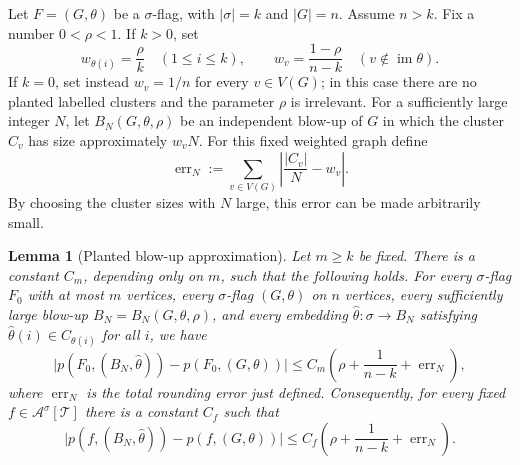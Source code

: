 \documentclass[11pt]{article}
\newtheorem{lemma}[theorem]{Lemma}
\theoremstyle{definition}
\newcommand{\A}{\mathcal{A}}
\newcommand{\T}{\mathcal{T}}
\begin{document}
Let $F=(G,\theta)$ be a $\sigma$-flag, with $|\sigma|=k$ and $|G|=n$.  Assume
$n>k$.  Fix a number $0<\rho<1$.  If $k>0$, set
\[
  w_{\theta(i)}=\frac{\rho}{k}\quad(1\le i\le k),
  \qquad
  w_v=\frac{1-\rho}{n-k}\quad(v\notin \operatorname{im}\theta).
\]
If $k=0$, set instead $w_v=1/n$ for every $v\in V(G)$; in this case there are
no planted labelled clusters and the parameter $\rho$ is irrelevant.
For a sufficiently large integer $N$, let $B_N(G,\theta,\rho)$ be an independent
blow-up of $G$ in which the cluster $C_v$ has size approximately $w_vN$.
For this fixed weighted graph define
\[
  \operatorname{err}_N
  :=
  \sum_{v\in V(G)}\left|\frac{|C_v|}{N}-w_v\right|.
\]
By choosing the cluster sizes with $N$ large, this error can be made arbitrarily
small.

\begin{lemma}[Planted blow-up approximation]\label{lem:planted}
Let $m\ge k$ be fixed.  There is a constant $C_m$, depending only on $m$, such
that the following holds.  For every $\sigma$-flag $F_0$ with at most $m$
vertices, every $\sigma$-flag $(G,\theta)$ on $n$ vertices, every sufficiently
large blow-up $B_N=B_N(G,\theta,\rho)$, and every embedding
$\widehat\theta:\sigma\to B_N$ satisfying
$\widehat\theta(i)\in C_{\theta(i)}$ for all $i$, we have
\begin{equation}\label{eq:planted-flag-bound}
  \bigl|p(F_0,(B_N,\widehat\theta))-p(F_0,(G,\theta))\bigr|
  \le
  C_m\left(\rho+\frac1{n-k}+\operatorname{err}_N\right),
\end{equation}
where $\operatorname{err}_N$ is the total rounding error just defined.
Consequently, for every fixed $f\in\A^\sigma[\T]$ there is a constant $C_f$ such
that
\begin{equation}\label{eq:planted-f-bound}
  \bigl|p(f,(B_N,\widehat\theta))-p(f,(G,\theta))\bigr|
  \le
  C_f\left(\rho+\frac1{n-k}+\operatorname{err}_N\right).
\end{equation}
\end{lemma}
\end{document}
